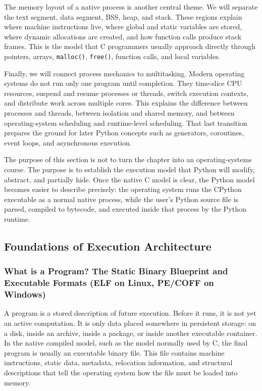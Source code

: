 \documentclass[a4paper,twoside]{report}
\begin{document}
The memory layout of a native process is another central theme. We will separate the text segment, data segment, BSS, heap, and stack. These regions explain where machine instructions live, where global and static variables are stored, where dynamic allocations are created, and how function calls produce stack frames. This is the model that C programmers usually approach directly through pointers, arrays, \texttt{malloc()}, \texttt{free()}, function calls, and local variables.

Finally, we will connect process mechanics to multitasking. Modern operating systems do not run only one program until completion. They time-slice CPU resources, suspend and resume processes or threads, switch execution contexts, and distribute work across multiple cores. This explains the difference between processes and threads, between isolation and shared memory, and between operating-system scheduling and runtime-level scheduling. That last transition prepares the ground for later Python concepts such as generators, coroutines, event loops, and asynchronous execution.

The purpose of this section is not to turn the chapter into an operating-systems course. The purpose is to establish the execution model that Python will modify, abstract, and partially hide. Once the native C model is clear, the Python model becomes easier to describe precisely: the operating system runs the CPython executable as a normal native process, while the user's Python source file is parsed, compiled to bytecode, and executed inside that process by the Python runtime.


\subsection{Foundations of Execution Architecture}
\subsubsection{What is a Program? The Static Binary Blueprint and Executable Formats (ELF on Linux, PE/COFF on Windows)}

A program is a stored description of future execution. Before it runs, it is not yet an active computation. It is only data placed somewhere in persistent storage: on a disk, inside an archive, inside a package, or inside another executable container. In the native compiled model, such as the model normally used by C, the final program is usually an executable binary file. This file contains machine instructions, static data, metadata, relocation information, and structural descriptions that tell the operating system how the file must be loaded into memory.
\end{document}

